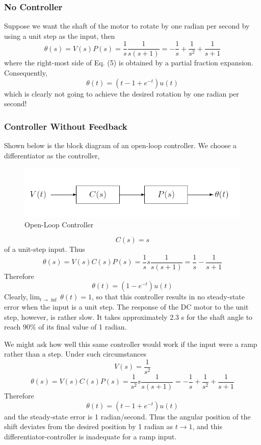 \documentclass[12pt]{article}
\begin{document}
\subsubsection{No Controller}
Suppose we want the shaft of the motor to rotate by one radian per second by using a unit step as the input, then
\begin{equation}
\theta(s)=V(s)P(s)=\frac{1}{s}\frac{1}{s(s+1)}=-\frac{1}{s}+\frac{1}{s^2}+\frac{1}{s+1}
\end{equation}
where the right-most side of Eq. (5) is obtained by a partial fraction expansion. Consequently,
\begin{equation}
\theta(t)=(t-1+e^{-t})u(t)
\end{equation}
which is clearly not going to achieve the desired rotation by one radian per second!
\subsubsection{Controller Without Feedback}
Shown below is the block diagram of an open-loop controller. We choose a differentiator as the controller,
\begin{figure}[H]
\centering
\includegraphics[scale=0.5]{P3.jpg}
\caption{Open-Loop Controller}
\end{figure}
\begin{equation}
C(s)=s
\end{equation}
of a unit-step input. Thus
\begin{equation}
\theta(s)=V(s)C(s)P(s)=\frac{1}{s}s\frac{1}{s(s+1)}=\frac{1}{s}-\frac{1}{s+1}
\end{equation}
Therefore 
\begin{equation}
\theta(t)=(1-e^{-t})u(t)
\end{equation}
Clearly,$\lim_{t\to\inf}\theta(t)=1$, so that this controller results in no steady-state error when the input is a unit step. The response of the DC motor to the unit step, however, is rather slow. It takes approximately 2.3 s for the shaft angle to reach $90\%$ of its final value of 1 radian.
\par We might ask how well this same controller would work if the input were a ramp rather than a step.
Under such circumstances
\begin{equation}
V(s)=\frac{1}{s^2}
\end{equation}
\begin{equation}
\theta(s)=V(s)C(s)P(s)=\frac{1}{s^2}s\frac{1}{s(s+1)}=-\frac{1}{s}+\frac{1}{s^2}+\frac{1}{s+1}
\end{equation}
Therefore
\begin{equation}
\theta(t)=(t-1+e^{-t})u(t)
\end{equation}
and the steady-state error is 1 radian/second. Thus the angular position of the shift deviates from the
desired position by 1 radian as $t\to 1$, and this differentiator-controller is inadequate for a ramp input.
\end{document}
